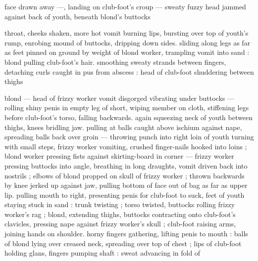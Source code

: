face drawn away —, landing on club-foot’s croup — sweaty fuzzy
head jammed against back of youth, beneath blond’s buttocks

throat, cheeks shaken, more hot vomit burning lips, bursting over top
of youth's rump, enrobing mound of buttocks, dripping down sides.
sliding along legs as far as feet pinned on ground by weight of blond
worker, trampling vomit into sand : blond pulling club-foot's hair.
smoothing sweaty strands between fingers, detaching curls caught in
pus from abscess : head of club-foot shuddering between thighs

blond — head of frizzy worker vomit disgorged vibrating under
buttocks — rolling shiny penis in empty leg of short, wiping member
on cloth, stiffening legs before club-foot's torso, falling backwards.
again squeezing neck of youth between thighs, knees bridling jaw.
pulling at balls caught above ischium against nape, spreading balls
back over groin — throwing punch into right loin of youth turning
with small steps, frizzy worker vomiting, crushed finger-nails hooked
into loins ; blond worker pressing fists against skirting-board in
corner — frizzy worker pressing buttocks into angle, breathing in
long draughts, vomit driven back into nostrils ; elbows of blond
propped on skull of frizzy worker ; thrown backwards by knee jerked
up against jaw, pulling bottom of face out of bag as far as upper lip.
pulling mouth to right, presenting penis for club-foot to suck, feet of
youth staying stuck in sand : trunk twisting ; torso twisted, buttocks
rolling frizzy worker's rag ; blond, extending thighs, buttocks
contracting onto club-foot's clavicles, pressing nape against frizzy
worker's skull ; club-foot raising arms, joining hands on shoulder.
horny fingers gathering, lifting penis to mouth : balls of blond lying
over creased neck, spreading over top of chest ; lips of club-foot
holding glans, fingers pumping shaft : sweat advancing in fold of

